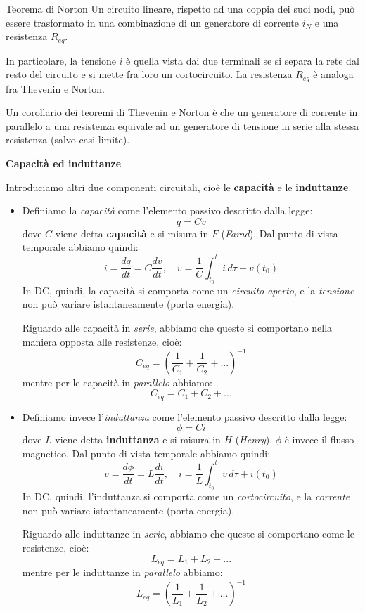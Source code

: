 \documentclass[a4paper,11pt]{article}
\begin{document}
\begin{theorem}{Teorema di Norton}
	Un circuito lineare, rispetto ad una coppia dei suoi nodi, può essere trasformato in una combinazione di un generatore di corrente $i_N$ e una resistenza $R_{eq}$.
\end{theorem}

In particolare, la tensione $i$ è quella vista dai due terminali se si separa la rete dal resto del circuito e si mette fra loro un cortocircuito. La resistenza $R_{eq}$ è analoga fra Thevenin e Norton.

Un corollario dei teoremi di Thevenin e Norton è che un generatore di corrente in parallelo a una resistenza equivale ad un generatore di tensione in serie alla stessa resistenza (salvo casi limite).

\par\smallskip

\noindent
\textbf{\textsf{Capacità ed induttanze}}

\noindent
Introduciamo altri due componenti circuitali, cioè le \textbf{capacità} e le \textbf{induttanze}.
\begin{itemize}
	\item Definiamo la \textit{capacità} come l'elemento passivo descritto dalla legge:
		$$
			q = Cv
		$$
		dove $C$ viene detta \textbf{capacità} e si misura in $F$ (\textit{Farad}). Dal punto di vista temporale abbiamo quindi:
		$$
		i = \frac{dq}{dt} = C \frac{dv}{dt}, \quad v = \frac{1}{C} \int_{t_0}^t i \, d\tau + v(t_0) 
		$$
		In DC, quindi, la capacità si comporta come un \textit{circuito aperto}, e la \textit{tensione} non può variare istantaneamente (porta energia).

		Riguardo alle capacità in \textit{serie}, abbiamo che queste si comportano nella maniera opposta alle resistenze, cioè:
		$$
		C_{eq} = \left( \frac{1}{C_1} + \frac{1}{C_2} + ... \right)^{-1}
		$$
		mentre per le capacità in \textit{parallelo} abbiamo:
		$$
		C_{eq} = C_1 + C_2 + ...
		$$
	\item Definiamo invece l'\textit{induttanza} come l'elemento passivo descritto dalla legge:
		$$
			\phi = Ci
		$$
		dove $L$ viene detta \textbf{induttanza} e si misura in $H$ (\textit{Henry}). $\phi$ è invece il flusso magnetico. Dal punto di vista temporale abbiamo quindi:
		$$
		v = \frac{d\phi}{dt} = L \frac{di}{dt}, \quad i = \frac{1}{L} \int_{t_0}^t v \, d\tau + i(t_0)
		$$
		In DC, quindi, l'induttanza si comporta come un \textit{cortocircuito}, e la \textit{corrente} non può variare istantaneamente (porta energia).
		
		Riguardo alle induttanze in \textit{serie}, abbiamo che queste si comportano come le resistenze, cioè:
		$$
		L_{eq} = L_1 + L_2 + ...
		$$
		mentre per le induttanze in \textit{parallelo} abbiamo:
		$$
		L_{eq} = \left( \frac{1}{L_1} + \frac{1}{L_2} + ... \right)^{-1}
		$$
\end{itemize}
\end{document}
